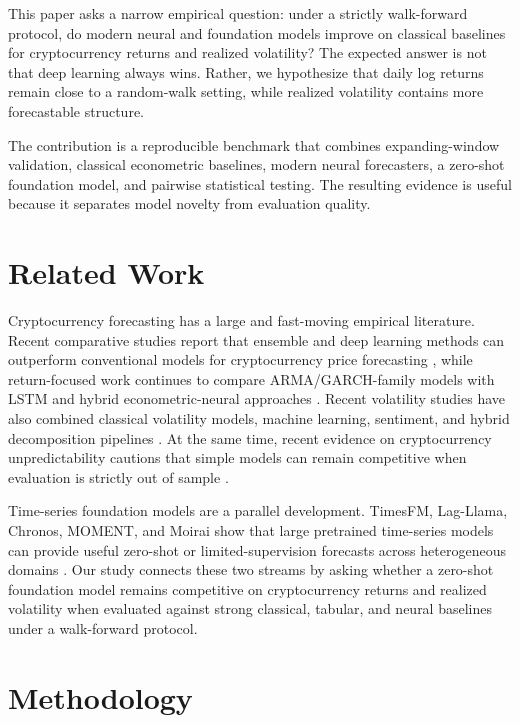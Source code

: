 \documentclass[10pt]{article}
\begin{document}
This paper asks a narrow empirical question: under a strictly walk-forward
protocol, do modern neural and foundation models improve on classical baselines
for cryptocurrency returns and realized volatility? The expected answer is not
that deep learning always wins. Rather, we hypothesize that daily log returns
remain close to a random-walk setting, while realized volatility contains more
forecastable structure.

The contribution is a reproducible benchmark that combines expanding-window
validation, classical econometric baselines, modern neural forecasters, a
zero-shot foundation model, and pairwise statistical testing. The resulting
evidence is useful because it separates model novelty from evaluation quality.

\section{Related Work}
Cryptocurrency forecasting has a large and fast-moving empirical literature.
Recent comparative studies report that ensemble and deep learning methods can
outperform conventional models for cryptocurrency price forecasting
\cite{bouteska2024cryptocurrency}, while return-focused work continues to
compare ARMA/GARCH-family models with LSTM and hybrid econometric-neural
approaches \cite{almadany2024forecasting}. Recent volatility studies have also
combined classical volatility models, machine learning, sentiment, and hybrid
decomposition pipelines \cite{brauneis2024crypto,wang2024ceemdan}. At the same
time, recent evidence on cryptocurrency unpredictability cautions that simple
models can remain competitive when evaluation is strictly out of sample
\cite{puoti2025quantifying}.

Time-series foundation models are a parallel development. TimesFM, Lag-Llama,
Chronos, MOMENT, and Moirai show that large pretrained time-series models can
provide useful zero-shot or limited-supervision forecasts across heterogeneous
domains \cite{das2024decoder,rasul2024lagllama,ansari2024chronos,goswami2024moment,woo2024unified}.
Our study connects these two streams by asking whether a zero-shot foundation
model remains competitive on cryptocurrency returns and realized volatility
when evaluated against strong classical, tabular, and neural baselines under a
walk-forward protocol.

\section{Methodology}
\end{document}
